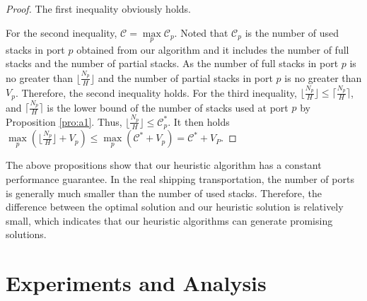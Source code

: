 \documentclass[review,3p,times,authoryear,12pt]{elsarticle}
\begin{document}
\begin{proof}

The first inequality obviously holds.

For the second inequality, $\mathcal{C}=\max\limits_p \mathcal{C}_p$.
Noted that $\mathcal{C}_p$ is the number of used stacks in port $p$ obtained from our algorithm and it includes the number of full stacks and the number of partial stacks.
As the number of full stacks in port $p$ is no greater than $\lfloor\frac{N_p}{H}\rfloor$ and the number of partial stacks in port $p$ is no greater than $V_p$.
Therefore, the second inequality holds.
For the third inequality, $\lfloor\frac{N_p}{H}\rfloor\leq \lceil\frac{N_p}{H}\rceil$, and $\lceil\frac{N_p}{H}\rceil$ is the lower bound of the number of stacks used at port $p$ by Proposition \ref{pro:a1}.
Thus, $\lfloor\frac{N_p}{H}\rfloor \le \mathcal{C}_p^*$.
It then holds $\max\limits_p(\lfloor\frac{N_p}{H}\rfloor+V_p) \le \max\limits_p(\mathcal{C}^*+V_p) = \mathcal{C}^*+V_P$.
\end{proof}


The above propositions show that our heuristic algorithm has a constant performance guarantee.
In the real shipping transportation, the number of ports is generally much smaller than the number of used stacks.
Therefore, the difference between the optimal solution and our heuristic solution is relatively small, which indicates that our heuristic algorithms can generate promising solutions.





\section{Experiments and Analysis}
\label{sec:ea}
\end{document}
